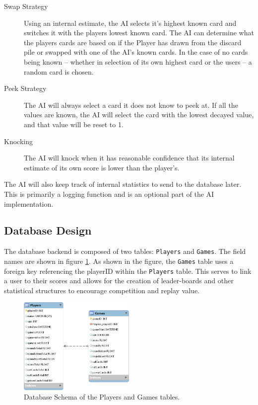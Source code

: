 \documentclass[12pt]{IEEEtran}
\begin{document}
	\begin{description}
		\item[Swap Strategy] \hspace{3em} Using an internal estimate, the AI selects it's highest known card and 						switches it with the players lowest known card. The AI can determine what the players cards are based on 				if the Player has drawn from the discard pile or swapped with one of the AI's known cards. In the case of 					no cards being known -- whether in selection of its own highest card or the users -- a random card is 					chosen. 
		\item[Peek Strategy] \hspace{3em} The AI will always select a card it does not know to peek at. If all the values are 			known, the AI will select the card with the lowest decayed value, and that value will be reset to 1.
		\item[Knocking] \hspace{3em}  The AI will knock when it has reasonable confidence that its internal estimate of its 			own score is lower than the player's.
	\end{description}

	The AI will also keep track of internal statistics to send to the database later. This is primarily a logging function and is an 	optional part of the AI implementation.

\subsection{Database Design}
\label{subsec:dbdesign}

	The database backend is composed of two tables: \texttt{Players} and \texttt{Games}. The field names are shown in 			figure \ref{fig:dbschema}. As shown in the figure, the \texttt{Games} table uses a foreign key referencing the 			playerID within the \texttt{Players} table. This serves to link a user to their scores and allows for the creation of 				leader-boards and other statistical structures to encourage competition and replay value.
	
	\begin{figure}[ht]
		\includegraphics[width=0.5\textwidth]{DatabaseDiagram.png}
		\caption[Database table design]{ Database Schema of the Players and Games tables.}
		\label{fig:dbschema}
	\end{figure}
\end{document}
